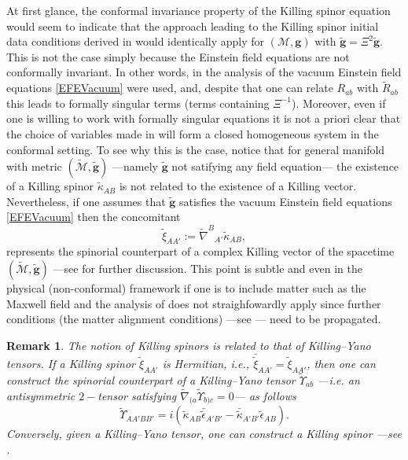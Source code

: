 \documentclass[10pt,a4paper]{article}
\theoremstyle{plain}
\newtheorem{remark}{Remark}
\def\bmg{{\bm g}}
\begin{document}
\medskip

At first glance, the conformal invariance property of the Killing
spinor equation would seem to indicate that the approach leading to
the Killing spinor initial data conditions derived in \cite{GarVal08c}
would identically apply for $(\mathcal{M},\bmg)$ with
$\tilde\bmg=\Xi^2\tilde{\bmg}$. This is not the case simply because
the Einstein field equations are not conformally invariant.  In other
words, in the analysis of \cite{GarVal08c} the vacuum Einstein field
equations \eqref{EFEVacuum} were used, and, despite that one can
relate $R_{ab}$ with $\tilde{R}_{ab}$ this leads to formally singular
terms (terms containing $\Xi^{-1}$). Moreover, even if one is willing
to work with formally singular equations it is not a priori clear that
the choice of variables made in \cite{GarVal08c} will form a closed
homogeneous system in the conformal setting.  To see why this is the
case, notice that for general manifold with metric
$(\tilde{\mathcal{M}},\tilde{\bmg})$ ---namely $\tilde{\bmg}$ not
satifying any field equation--- the existence of a Killing spinor
$\tilde{\kappa}_{AB}$ is not related to the existence of a
Killing vector.
Nevertheless, if one assumes that $\tilde{\bmg}$
satisfies the vacuum Einstein field equations \eqref{EFEVacuum} then
the concomitant
\begin{equation*}
\tilde{\xi}_{AA'} := \tilde{\nabla}^{B}{}_{A'}\tilde{\kappa}_{AB},
\end{equation*}
represents the spinorial counterpart of a complex Killing vector of
the spacetime $(\tilde{\mathcal{M}},\tilde{\bmg})$ ---see
\cite{GarVal08c} for further discussion. This point is subtle and even
in the physical (non-conformal) framework if one is to include matter
such as the Maxwell field and the analysis of \cite{GarVal08c} does
not straighfowardly apply since further conditions (the matter
alignment conditions) ---see \cite{ValCol16}--- need to be propagated.



\begin{remark}
  \emph{
  The notion of Killing spinors is related to that
  of Killing--Yano tensors. If a Killing spinor
$\tilde{\xi}_{AA'}$ is Hermitian, i.e.,
$\bar{\tilde{\xi}}_{AA'}=\tilde{\xi}_{AA'}$, then one can construct the
spinorial counterpart of a \emph{Killing--Yano tensor}
$\tilde{\Upsilon}_{ab}$ ---i.e. an antisymmetric $2-$tensor satisfying
$\tilde{\nabla}_{(a}\tilde{\Upsilon}_{b)c}=0$--- as follows
\[\tilde{\Upsilon}_{AA'BB'}=i(\tilde{\kappa}_{AB}\bar{\tilde{\epsilon}}_{A'B'}
-\bar{\tilde{\kappa}}_{A'B'}\tilde{\epsilon}_{AB}).\] Conversely,
given a Killing--Yano tensor, one can construct a Killing spinor
---see \cite{ValCol16,McLBer93,PenRin86}.}
\end{remark}
\end{document}
